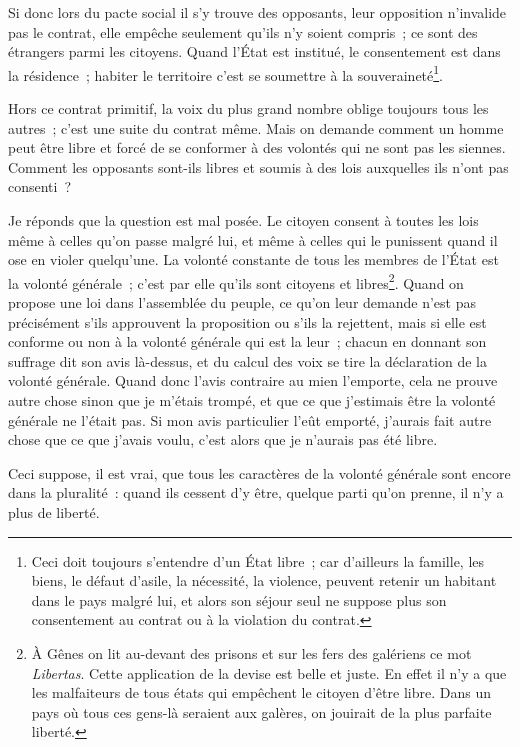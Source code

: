 \documentclass[french,twoside]{book} %
\begin{document}
Si donc lors du pacte social il s’y trouve des opposants, leur opposition n’invalide pas le contrat, elle empêche seulement qu’ils n’y soient compris ; ce sont des étrangers parmi les citoyens. Quand l’État est institué, le consentement est dans la résidence ; habiter le territoire c’est se soumettre à la souveraineté\footnote{Ceci doit toujours s’entendre d’un État libre ; car d’ailleurs la famille, les biens, le défaut d’asile, la nécessité, la violence, peuvent retenir un habitant dans le pays malgré lui, et alors son séjour seul ne suppose plus son consentement au contrat ou à la violation du contrat.}.\par
Hors ce contrat primitif, la voix du plus grand nombre oblige toujours tous les autres ; c’est une suite du contrat même. Mais on demande comment un homme peut être libre et forcé de se conformer à des volontés qui ne sont pas les siennes. Comment les opposants sont-ils libres et soumis à des lois auxquelles ils n’ont pas consenti ?\par
Je réponds que la question est mal posée. Le citoyen consent à toutes les lois même à celles qu’on passe malgré lui, et même à celles qui le punissent quand il ose en violer quelqu’une. La volonté constante de tous les membres de l’État est la volonté générale ; c’est par elle qu’ils sont citoyens et libres\footnote{À Gênes on lit au-devant des prisons et sur les fers des galériens ce mot {\itshape Libertas}. Cette application de la devise est belle et juste. En effet il n’y a que les malfaiteurs de tous états qui empêchent le citoyen d’être libre. Dans un pays où tous ces gens-là seraient aux galères, on jouirait de la plus parfaite liberté.}. Quand on propose une loi dans l’assemblée du peuple, ce qu’on leur demande n’est pas précisément s’ils approuvent la proposition ou s’ils la rejettent, mais si elle est conforme ou non à la volonté générale qui est la leur ; chacun en donnant son suffrage dit son avis là-dessus, et du calcul des voix se tire la déclaration de la volonté générale. Quand donc l’avis contraire au mien l’emporte, cela ne prouve autre chose sinon que je m’étais trompé, et que ce que j’estimais être la volonté générale ne l’était pas. Si mon avis particulier l’eût emporté, j’aurais fait autre chose que ce que j’avais voulu, c’est alors que je n’aurais pas été libre.\par
Ceci suppose, il est vrai, que tous les caractères de la volonté générale sont encore dans la pluralité : quand ils cessent d’y être, quelque parti qu’on prenne, il n’y a plus de liberté.\par
\end{document}
